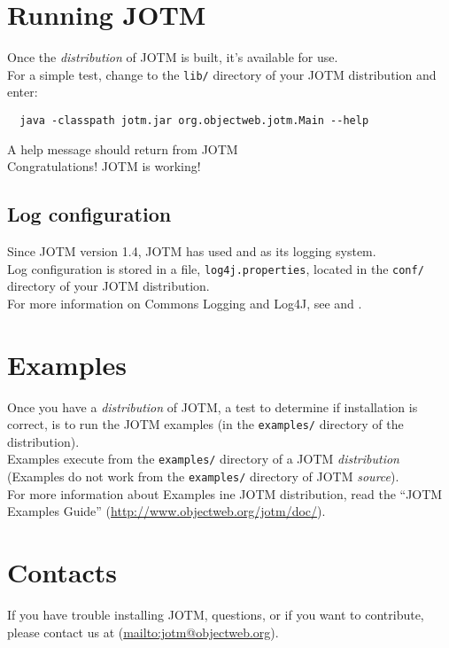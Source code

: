 \documentclass[a4paper,11pt]{article}
\begin{document}
\section{Running JOTM}
\label{sec:jotm_run}
Once the \emph{distribution} of JOTM is built, it's available for use.\\
For a simple test, change to the \texttt{lib/} directory of your JOTM
distribution and enter:
\begin{verbatim}
  java -classpath jotm.jar org.objectweb.jotm.Main --help
\end{verbatim}
A help message should return from JOTM\\
Congratulations! JOTM is working!\\


\subsection{Log configuration}
\label{sec:log_conf}
Since JOTM version 1.4,  JOTM has used
 and 
as its logging system.\\
Log configuration is stored in a file, \texttt{log4j.properties},
located in the \texttt{conf/} directory of your JOTM distribution.\\

\noindent For more information on Commons Logging and Log4J, see
and .

\section{Examples}
\label{sec:examples}
Once you have a \emph{distribution} of JOTM, a test to determine if
installation is correct, is to run the JOTM examples (in the
\texttt{examples/} directory of the distribution).\\
Examples execute from the \texttt{examples/} directory of a
JOTM \emph{distribution} (Examples do not work from the \texttt{examples/}
directory of JOTM \emph{source}).\\

\noindent For more information about Examples ine 
JOTM distribution, read the ``JOTM Examples Guide''
(\url{http://www.objectweb.org/jotm/doc/}).

\section{Contacts}
\label{sec:contacts}

If you have trouble installing JOTM, questions, or if you want
to contribute, please contact us at
(\url{mailto:jotm@objectweb.org}).
\end{document}
